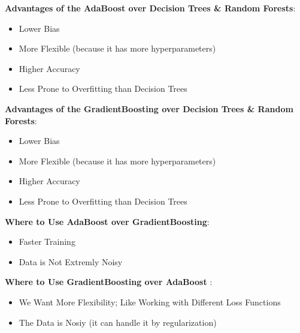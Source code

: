 \documentclass[a4paper,12pt]{article}
\begin{document}
\noindent\textbf{Advantages of the AdaBoost over Decision Trees \& Random Forests}:
\begin{itemize}
    \item Lower Bias
    \item More Flexible (because it has more hyperparameters)
    \item Higher Accuracy 
    \item Less Prone to Overfitting than Decision Trees
\end{itemize} 

\noindent\textbf{Advantages of the GradientBoosting over Decision Trees \& Random Forests}:
\begin{itemize}
    \item Lower Bias
    \item More Flexible (because it has more hyperparameters)
    \item Higher Accuracy 
    \item Less Prone to Overfitting than Decision Trees
\end{itemize} 

\noindent\textbf{Where to Use AdaBoost over GradientBoosting}:
\begin{itemize}
    \item Faster Training
    \item Data is Not Extremly Noisy
\end{itemize} 

\noindent\textbf{Where to Use GradientBoosting over AdaBoost }:
\begin{itemize}
    \item We Want More Flexibility; Like Working with Different Loss Functions
    \item The Data is Nosiy (it can handle it by regularization)
\end{itemize} 
\end{document}
